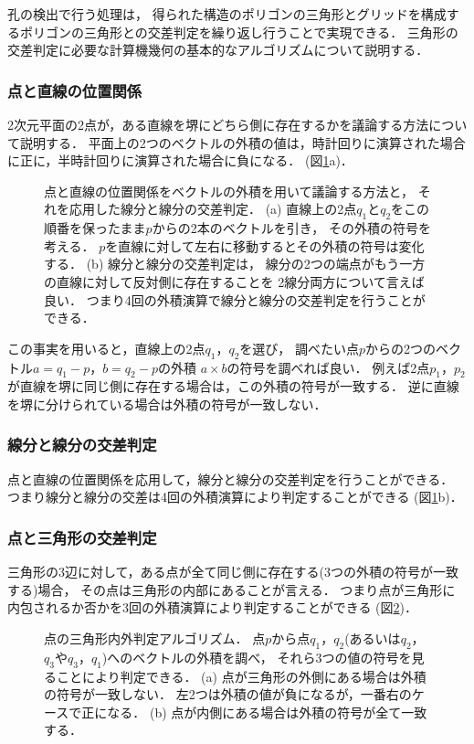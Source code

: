 孔の検出で行う処理は，
得られた構造のポリゴンの三角形とグリッドを構成するポリゴンの三角形との交差判定を繰り返し行うことで実現できる．
三角形の交差判定に必要な計算機幾何の基本的なアルゴリズムについて説明する．


\subsubsection{点と直線の位置関係}
2次元平面の2点が，ある直線を堺にどちら側に存在するかを議論する方法について説明する．
平面上の2つのベクトルの外積の値は，時計回りに演算された場合に正に，半時計回りに演算された場合に負になる．
(図\ref{fig:segment_segment}a)．
\begin{figure}
    \centering
    
    \caption{
        点と直線の位置関係をベクトルの外積を用いて議論する方法と，
        それを応用した線分と線分の交差判定．
        (a) 直線上の2点$q_1$と$q_2$をこの順番を保ったまま$p$からの2本のベクトルを引き，
            その外積の符号を考える．
            $p$を直線に対して左右に移動するとその外積の符号は変化する．
        (b) 線分と線分の交差判定は，
            線分の2つの端点がもう一方の直線に対して反対側に存在することを
            2線分両方について言えば良い．
            つまり4回の外積演算で線分と線分の交差判定を行うことができる．
    }
    \label{fig:segment_segment}
\end{figure}
この事実を用いると，直線上の2点$q_1$，$q_2$を選び，
調べたい点$p$からの2つのベクトル$a=q_1-p$，$b=q_2-p$の外積
$a\times b$の符号を調べれば良い．
例えば2点$p_1$，$p_2$が直線を堺に同じ側に存在する場合は，この外積の符号が一致する．
逆に直線を堺に分けられている場合は外積の符号が一致しない．


\subsubsection{線分と線分の交差判定}
点と直線の位置関係を応用して，線分と線分の交差判定を行うことができる．
つまり線分と線分の交差は4回の外積演算により判定することができる
(図\ref{fig:segment_segment}b)．


\subsubsection{点と三角形の交差判定}
三角形の3辺に対して，ある点が全て同じ側に存在する(3つの外積の符号が一致する)場合，
その点は三角形の内部にあることが言える．
つまり点が三角形に内包されるか否かを3回の外積演算により判定することができる
(図\ref{fig:point_triangle})．
\begin{figure}
    \centering
    
    \caption{
        点の三角形内外判定アルゴリズム．
        点$p$から点$q_1$，$q_2$(あるいは$q_2$，$q_3$や$q_3$，$q_1$)へのベクトルの外積を調べ，
        それら3つの値の符号を見ることにより判定できる．
        (a) 点が三角形の外側にある場合は外積の符号が一致しない．
            左2つは外積の値が負になるが，一番右のケースで正になる．
        (b) 点が内側にある場合は外積の符号が全て一致する．
    }
    \label{fig:point_triangle}
\end{figure}


